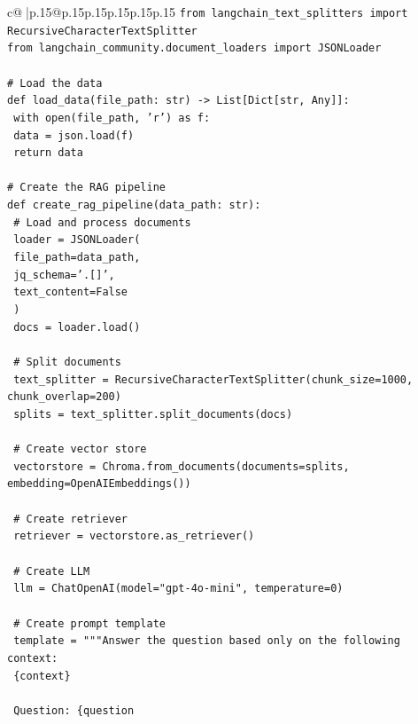 \documentclass{article}
\begin{document}
{\begin{supertabular}{c@{$\;$}|p{.15\linewidth}@{}p{.15\linewidth}p{.15\linewidth}p{.15\linewidth}p{.15\linewidth}p{.15\linewidth}}
{{{\texttt{from langchain\_text\_splitters import RecursiveCharacterTextSplitter} \\
\texttt{from langchain\_community.document\_loaders import JSONLoader} \\
\\ 
\texttt{\# Load the data} \\
\texttt{def load\_data(file\_path: str) {-}> List{[}Dict{[}str, Any{]}{]}:} \\
\texttt{    with open(file\_path, 'r') as f:} \\
\texttt{        data = json.load(f)} \\
\texttt{    return data} \\
\\ 
\texttt{\# Create the RAG pipeline} \\
\texttt{def create\_rag\_pipeline(data\_path: str):} \\
\texttt{    \# Load and process documents} \\
\texttt{    loader = JSONLoader(} \\
\texttt{        file\_path=data\_path,} \\
\texttt{        jq\_schema='.{[}{]}',} \\
\texttt{        text\_content=False} \\
\texttt{    )} \\
\texttt{    docs = loader.load()} \\
\\ 
\texttt{    \# Split documents} \\
\texttt{    text\_splitter = RecursiveCharacterTextSplitter(chunk\_size=1000, chunk\_overlap=200)} \\
\texttt{    splits = text\_splitter.split\_documents(docs)} \\
\\ 
\texttt{    \# Create vector store} \\
\texttt{    vectorstore = Chroma.from\_documents(documents=splits, embedding=OpenAIEmbeddings())} \\
\\ 
\texttt{    \# Create retriever} \\
\texttt{    retriever = vectorstore.as\_retriever()} \\
\\ 
\texttt{    \# Create LLM} \\
\texttt{    llm = ChatOpenAI(model="gpt{-}4o{-}mini", temperature=0)} \\
\\ 
\texttt{    \# Create prompt template} \\
\texttt{    template = """Answer the question based only on the following context:} \\
\texttt{    \{context\}} \\
\\ 
\texttt{    Question: \{question} \\
            }
        }
    }
     \\ \\


\end{supertabular}}
\end{document}
